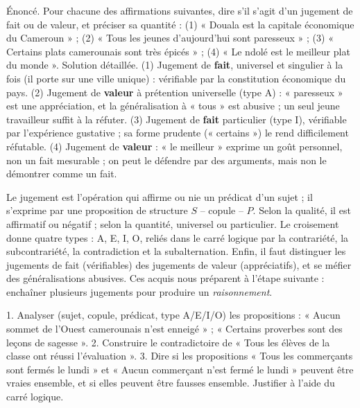 \documentclass[11pt]{article}
\begin{document}
\begin{exoresolu}
Énoncé. Pour chacune des affirmations suivantes, dire s'il s'agit d'un jugement de fait ou de valeur, et préciser sa quantité : (1) « Douala est la capitale économique du Cameroun » ; (2) « Tous les jeunes d'aujourd'hui sont paresseux » ; (3) « Certains plats camerounais sont très épicés » ; (4) « Le ndolé est le meilleur plat du monde ».
\tcblower
Solution détaillée. (1) Jugement de \textbf{fait}, universel et singulier à la fois (il porte sur une ville unique) : vérifiable par la constitution économique du pays. (2) Jugement de \textbf{valeur} à prétention universelle (type A) : « paresseux » est une appréciation, et la généralisation à « tous » est abusive ; un seul jeune travailleur suffit à la réfuter. (3) Jugement de \textbf{fait} particulier (type I), vérifiable par l'expérience gustative ; sa forme prudente (« certains ») le rend difficilement réfutable. (4) Jugement de \textbf{valeur} : « le meilleur » exprime un goût personnel, non un fait mesurable ; on peut le défendre par des arguments, mais non le démontrer comme un fait.
\end{exoresolu}

\begin{aretenir}
Le jugement est l'opération qui affirme ou nie un prédicat d'un sujet ; il s'exprime par une proposition de structure $S$ -- copule -- $P$. Selon la qualité, il est affirmatif ou négatif ; selon la quantité, universel ou particulier. Le croisement donne quatre types : A, E, I, O, reliés dans le carré logique par la contrariété, la subcontrariété, la contradiction et la subalternation. Enfin, il faut distinguer les jugements de fait (vérifiables) des jugements de valeur (appréciatifs), et se méfier des généralisations abusives. Ces acquis nous préparent à l'étape suivante : enchaîner plusieurs jugements pour produire un \emph{raisonnement}.
\end{aretenir}

\begin{exercice}
1. Analyser (sujet, copule, prédicat, type A/E/I/O) les propositions : « Aucun sommet de l'Ouest camerounais n'est enneigé » ; « Certains proverbes sont des leçons de sagesse ». 2. Construire le contradictoire de « Tous les élèves de la classe ont réussi l'évaluation ». 3. Dire si les propositions « Tous les commerçants sont fermés le lundi » et « Aucun commerçant n'est fermé le lundi » peuvent être vraies ensemble, et si elles peuvent être fausses ensemble. Justifier à l'aide du carré logique.
\end{exercice}
\end{document}
